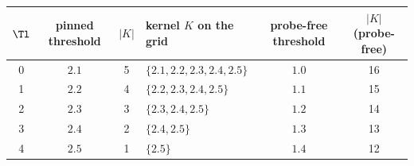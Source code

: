 \begin{tabular}{@{}c c c l c c@{}}
\toprule
$\Tl$ & pinned threshold & $|K|$ & kernel $K$ on the grid & probe-free threshold & $|K|$ (probe-free)\\
\midrule
0 & $2.1$ & 5 & $\{2.1, 2.2, 2.3, 2.4, 2.5\}$ & $1.0$ & 16\\
1 & $2.2$ & 4 & $\{2.2, 2.3, 2.4, 2.5\}$ & $1.1$ & 15\\
2 & $2.3$ & 3 & $\{2.3, 2.4, 2.5\}$ & $1.2$ & 14\\
3 & $2.4$ & 2 & $\{2.4, 2.5\}$ & $1.3$ & 13\\
4 & $2.5$ & 1 & $\{2.5\}$ & $1.4$ & 12\\
\bottomrule
\end{tabular}
